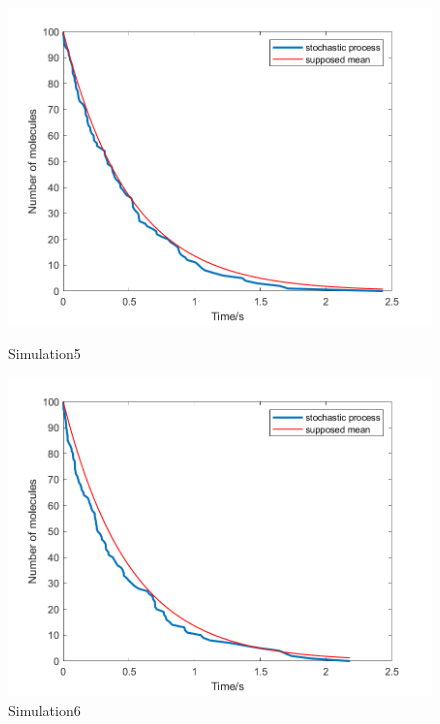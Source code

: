 \documentclass{article}
\begin{document}
\begin{figure}[htbp]
    \centering
    \begin{minipage}{0.45\linewidth}
        \centering
        \includegraphics[width=\linewidth]{graph/b5.png}
        \caption{Simulation5}
        \label{b5}
    \end{minipage}
    \hfill
    \begin{minipage}{0.45\linewidth}
        \centering
        \includegraphics[width=\linewidth]{graph/b6.png}
        \caption{Simulation6}
        \label{b6}
    \end{minipage}
\end{figure}
\end{document}
